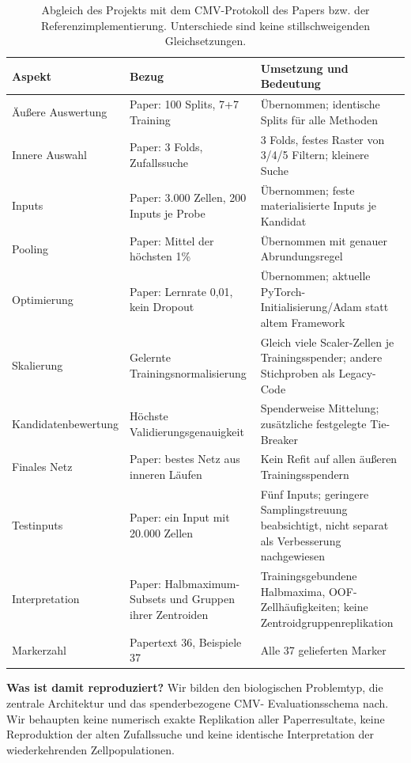 \documentclass[11pt,a4paper]{article}
\begin{document}
\begin{table}[!ht]\centering\small
\caption{Abgleich des Projekts mit dem CMV-Protokoll des Papers bzw. der
Referenzimplementierung. Unterschiede sind keine stillschweigenden Gleichsetzungen.}
\begin{tabular}{p{3.5cm}p{5.5cm}p{6cm}}\toprule
Aspekt & Bezug & Umsetzung und Bedeutung\\\midrule
Äußere Auswertung & Paper: 100 Splits, 7+7 Training & Übernommen; identische Splits für alle Methoden\\
Innere Auswahl & Paper: 3 Folds, Zufallssuche & 3 Folds, festes Raster von 3/4/5 Filtern; kleinere Suche\\
Inputs & Paper: 3.000 Zellen, 200 Inputs je Probe & Übernommen; feste materialisierte Inputs je Kandidat\\
Pooling & Paper: Mittel der höchsten 1\% & Übernommen mit genauer Abrundungsregel\\
Optimierung & Paper: Lernrate 0,01, kein Dropout & Übernommen; aktuelle PyTorch-Initialisierung/Adam statt altem Framework\\
Skalierung & Gelernte Trainingsnormalisierung & Gleich viele Scaler-Zellen je Trainingsspender; andere Stichproben als Legacy-Code\\
Kandidatenbewertung & Höchste Validierungsgenauigkeit & Spenderweise Mittelung; zusätzliche festgelegte Tie-Breaker\\
Finales Netz & Paper: bestes Netz aus inneren Läufen & Kein Refit auf allen äußeren Trainingsspendern\\
Testinputs & Paper: ein Input mit 20.000 Zellen & Fünf Inputs; geringere Samplingstreuung beabsichtigt, nicht separat als Verbesserung nachgewiesen\\
Interpretation & Paper: Halbmaximum-Subsets und Gruppen ihrer Zentroiden & Trainingsgebundene Halbmaxima, OOF-Zellhäufigkeiten; keine Zentroidgruppenreplikation\\
Markerzahl & Papertext 36, Beispiele 37 & Alle 37 gelieferten Marker\\
\bottomrule\end{tabular}
\end{table}

\textbf{Was ist damit reproduziert?} Wir bilden den biologischen
Problemtyp, die zentrale Architektur und das spenderbezogene CMV-
Evaluationsschema nach. Wir behaupten keine numerisch exakte Replikation
aller Paperresultate, keine Reproduktion der alten Zufallssuche und keine
identische Interpretation der wiederkehrenden Zellpopulationen.
\end{document}
